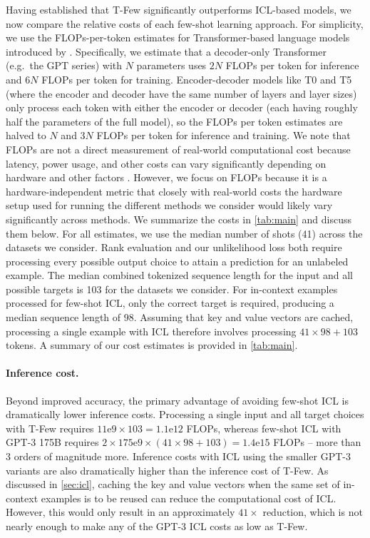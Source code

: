 Having established that {\selectfont T-Few} significantly outperforms ICL-based models, we now compare the relative costs of each few-shot learning approach. For simplicity, we use the FLOPs-per-token estimates for Transformer-based language models introduced by \citet{kaplan2020scaling}.
Specifically, we estimate that a decoder-only Transformer (e.g.\ the GPT series) with $N$ parameters uses $2N$ FLOPs per token for inference and $6N$ FLOPs per token for training. Encoder-decoder models like T0 and T5 (where the encoder and decoder have the same number of layers and layer sizes) only process each token with either the encoder or decoder (each having roughly half the parameters of the full model), so the FLOPs per token estimates are halved to $N$ and $3N$ FLOPs per token for inference and training. We note that FLOPs are not a direct measurement of real-world computational cost because latency, power usage, and other costs can vary significantly depending on hardware and other factors \cite{dehgani2021efficiency}. However, we focus on FLOPs because it is a hardware-independent metric that closely with real-world costs the hardware setup used for running the different methods we consider would likely vary significantly across methods. We summarize the costs in \ref{tab:main} and discuss them below. For all estimates, we use the median number of shots (41) across the datasets we consider. Rank evaluation and our unlikelihood loss both require processing every possible output choice to attain a prediction for an unlabeled example. The median combined tokenized sequence length for the input and all possible targets is 103 for the datasets we consider. For in-context examples processed for few-shot ICL, only the correct target is required, producing a median sequence length of 98. Assuming that key and value vectors are cached, processing a single example with ICL therefore involves processing $41 \times 98 + 103$ tokens. A summary of our cost estimates is provided in \ref{tab:main}.

\paragraph{Inference cost.}

Beyond improved accuracy, the primary advantage of avoiding few-shot ICL is dramatically lower inference costs. Processing a single input and all target choices with {\selectfont T-Few} requires $11{\text{e}}9 \times 103 = 1.1{\text{e}}12$ FLOPs, whereas few-shot ICL with GPT-3 175B requires $2 \times 175{\text{e}}9 \times (41 \times 98 + 103) = 1.4{\text{e}}15$ FLOPs -- more than 3 orders of magnitude more. Inference costs with ICL using the smaller GPT-3 variants are also dramatically higher than the inference cost of {\selectfont T-Few}. As discussed in \ref{sec:icl}, caching the key and value vectors when the same set of in-context examples is to be reused can reduce the computational cost of ICL. However, this would only result in an approximately $41\times$ reduction, which is not nearly enough to make any of the GPT-3 ICL costs as low as {\selectfont T-Few}.


